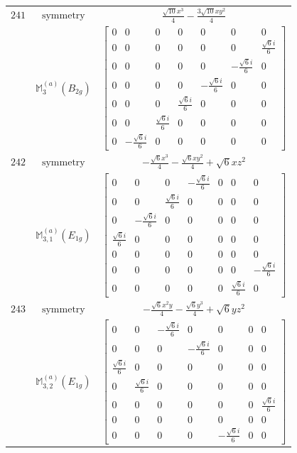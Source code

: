 \documentclass[fleqn,8pt,landscape]{jsarticle}
\begin{document}
\begin{longtable}{ccc}
$ 241 $ & $ \text{symmetry} $ & $ \frac{\sqrt{10} x^{3}}{4} - \frac{3 \sqrt{10} x y^{2}}{4} $ \\
$  $ & $ \mathbb{M}_{3}^{(a)}(B_{2g}) $ & $ \begin{bmatrix} 0 & 0 & 0 & 0 & 0 & 0 & 0 \\ 0 & 0 & 0 & 0 & 0 & 0 & \frac{\sqrt{6} i}{6} \\ 0 & 0 & 0 & 0 & 0 & - \frac{\sqrt{6} i}{6} & 0 \\ 0 & 0 & 0 & 0 & - \frac{\sqrt{6} i}{6} & 0 & 0 \\ 0 & 0 & 0 & \frac{\sqrt{6} i}{6} & 0 & 0 & 0 \\ 0 & 0 & \frac{\sqrt{6} i}{6} & 0 & 0 & 0 & 0 \\ 0 & - \frac{\sqrt{6} i}{6} & 0 & 0 & 0 & 0 & 0 \end{bmatrix} $ \\ \hline
$ 242 $ & $ \text{symmetry} $ & $ - \frac{\sqrt{6} x^{3}}{4} - \frac{\sqrt{6} x y^{2}}{4} + \sqrt{6} x z^{2} $ \\
$  $ & $ \mathbb{M}_{3,1}^{(a)}(E_{1g}) $ & $ \begin{bmatrix} 0 & 0 & 0 & - \frac{\sqrt{6} i}{6} & 0 & 0 & 0 \\ 0 & 0 & \frac{\sqrt{6} i}{6} & 0 & 0 & 0 & 0 \\ 0 & - \frac{\sqrt{6} i}{6} & 0 & 0 & 0 & 0 & 0 \\ \frac{\sqrt{6} i}{6} & 0 & 0 & 0 & 0 & 0 & 0 \\ 0 & 0 & 0 & 0 & 0 & 0 & 0 \\ 0 & 0 & 0 & 0 & 0 & 0 & - \frac{\sqrt{6} i}{6} \\ 0 & 0 & 0 & 0 & 0 & \frac{\sqrt{6} i}{6} & 0 \end{bmatrix} $ \\ \hline
$ 243 $ & $ \text{symmetry} $ & $ - \frac{\sqrt{6} x^{2} y}{4} - \frac{\sqrt{6} y^{3}}{4} + \sqrt{6} y z^{2} $ \\
$  $ & $ \mathbb{M}_{3,2}^{(a)}(E_{1g}) $ & $ \begin{bmatrix} 0 & 0 & - \frac{\sqrt{6} i}{6} & 0 & 0 & 0 & 0 \\ 0 & 0 & 0 & - \frac{\sqrt{6} i}{6} & 0 & 0 & 0 \\ \frac{\sqrt{6} i}{6} & 0 & 0 & 0 & 0 & 0 & 0 \\ 0 & \frac{\sqrt{6} i}{6} & 0 & 0 & 0 & 0 & 0 \\ 0 & 0 & 0 & 0 & 0 & 0 & \frac{\sqrt{6} i}{6} \\ 0 & 0 & 0 & 0 & 0 & 0 & 0 \\ 0 & 0 & 0 & 0 & - \frac{\sqrt{6} i}{6} & 0 & 0 \end{bmatrix} $ \\ \hline

\end{longtable}
\end{document}
